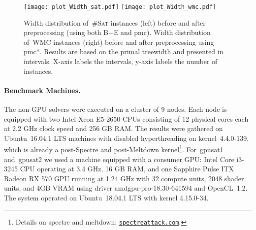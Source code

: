 \documentclass{llncs}
\newcommand{\cSAT}{\textsc{\#Sat}\xspace}%
\newcommand{\WMC}{\textsc{WMC}\xspace}%
\newcommand{\gpusatnu}{{\small\textsf{gpusat2}}\xspace}
\newcommand{\gpusatone}{{\small\textsf{gpusat1}}\xspace}
\begin{document}
\begin{figure}[bt]
\centering
\vspace{0pt}\texttt{[image: plot\_Width\_sat.pdf]}%
\hspace{6pt}\texttt{[image: plot\_Width\_wmc.pdf]}%
\caption{%
  Width distribution of~\cSAT instances (left) before and after
  preprocessing (using both B+E and pmc).  Width distribution of~\WMC
  instances (right) before and after preprocessing using pmc*.
  Results are based on the primal treewidth and presented in
  intervals.  X-axis labels the intervals, y-axis labels the number of
  instances.
%
}%
\label{fig:distribution}
\end{figure}
%

\paragraph{Benchmark Machines.}
%
%
%
%
The non-GPU solvers were executed on a cluster of 9 nodes. Each node is equipped
with two Intel Xeon E5-2650 CPUs consisting of 12 physical cores each
at 2.2 GHz clock speed and 256 GB RAM. %
The results were gathered on Ubuntu~16.04.1 LTS machines with disabled hyperthreading
on kernel~4.4.0-139, which is already a post-Spectre and
post-Meltdown kernel\footnote{Details on spectre and meltdown: \href{https://spectreattack.com/}{\nolinkurl{spectreattack.com}}.}.
%
%
For~\gpusatone and~\gpusatnu we used a machine equipped with a consumer GPU:
%
Intel Core i3-3245 CPU operating at 3.4 GHz, 16 GB RAM, and one
Sapphire Pulse ITX Radeon RX 570 GPU running at 1.24 GHz with 32
compute units, 2048 shader units, and 4GB VRAM using driver
amdgpu-pro-18.30-641594 and OpenCL~1.2.
The system operated on Ubuntu~18.04.1 LTS with kernel 4.15.0-34.
%




%
%
%
%
%
%
%
%
%
%
%
%
%
%
%
%
%
%
%
%
%
%
%
%
%
%
%
%
%
%
%
%
%
%
%
\end{document}
